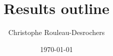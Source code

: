 \documentclass{article}\usepackage[]{graphicx}\usepackage[]{xcolor}
\begin{document}

\title{Results outline}
\author{Christophe Rouleau-Desrochers}
\date{\today}
\maketitle

\newcommand{\Ainc}{\textit{A. incana}}
\newcommand{\Ball}{\textit{B. alleghaniensis}}
\newcommand{\Bpap}{\textit{B. papyrifera}}
\newcommand{\Bpop}{\textit{B. populifolia}}





\end{document}

